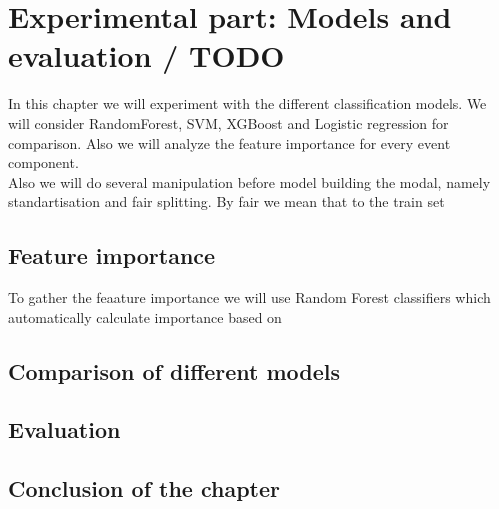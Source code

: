 \chapter{Experimental part: Models and evaluation / TODO}
\label{chap:model}
In this chapter we will experiment with the different classification models. We will consider RandomForest, SVM, XGBoost and Logistic regression for comparison. Also we will analyze the feature importance for every event component.\\

Also we will do several manipulation before model building the modal, namely standartisation and fair splitting. By fair we mean that to the train set 
\section{Feature importance}
To gather the feaature importance we will use Random Forest classifiers which automatically calculate importance based on 

\section{Comparison of different models}

\section{Evaluation}

\section*{Conclusion of the chapter}
\label{sec:eval}